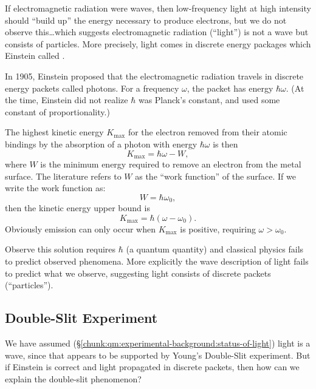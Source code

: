 If electromagnetic radiation were waves, then low-frequency light at
high intensity  should ``build up'' the energy necessary to produce
electrons, but we do not observe this\dots which suggests
electromagnetic radiation (``light'') is not a wave but consists of
particles. More precisely, light comes in discrete energy packages which
Einstein called .

In 1905, Einstein proposed that the electromagnetic radiation travels in
discrete energy packets called photons. For a frequency $\omega$, the
packet has energy $\hbar\omega$. (At the time, Einstein did not realize
$\hbar$ was Planck's constant, and used some constant of proportionality.)

The highest kinetic energy $K_{\text{max}}$ for the electron removed
from their atomic bindings by the absorption of a photon with energy
$\hbar\omega$ is then
\begin{equation}
K_{\text{max}} = \hbar\omega - W,
\end{equation}
where $W$ is the minimum energy required to remove an electron from the
metal surface. The literature refers to $W$ as the ``work function'' of
the surface. If we write the work function as:
\begin{equation}
W = \hbar\omega_{0},
\end{equation}
then the kinetic energy upper bound is
\begin{equation}
K_{\text{max}} = \hbar(\omega - \omega_{0}).
\end{equation}
Obviously emission can only occur when $K_{\text{max}}$ is positive,
requiring $\omega>\omega_{0}$.

Observe this solution requires $\hbar$ (a quantum quantity) and
classical physics fails to predict observed phenomena. More explicitly
the wave description of light fails to predict what we observe,
suggesting light consists of discrete packets (``particles'').

\subsection{Double-Slit Experiment}

We have assumed (\S\ref{chunk:qm:experimental-background:status-of-light})
light is a wave, since that appears to be supported by Young's
Double-Slit experiment. But if Einstein is correct and light propagated
in discrete packets, then how can we explain the double-slit phenomenon?

